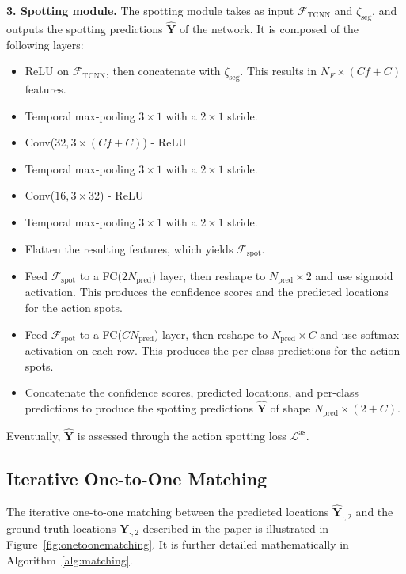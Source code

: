 \documentclass[10pt,twocolumn,letterpaper]{article}
\begin{document}
\textbf{\color{Green}3. Spotting module.} The spotting module takes as input $\mathcal{F}_\text{TCNN}$ and $\zeta_\text{seg}$, and outputs the spotting predictions $\hat{\textbf{Y}}$ of the network. It is composed of the following layers:
\begin{itemize}
    \item ReLU on $\mathcal{F}_\text{TCNN}$, then concatenate with $\zeta_\text{seg}$. This results in $N_F\times (Cf+C)$ features.
    \item Temporal max-pooling $3\times 1$ with a $2\times 1$ stride.
    \item Conv($32, 3\times (Cf+C)$) - ReLU
    \item Temporal max-pooling $3\times 1$ with a $2\times 1$ stride.
    \item Conv($16, 3\times 32$) - ReLU
    \item Temporal max-pooling $3\times 1$ with a $2\times 1$ stride.
    \item Flatten the resulting features, which yields $\mathcal{F}_\text{spot}$.
    \item Feed $\mathcal{F}_\text{spot}$ to a FC($2N_\text{pred}$) layer, then reshape to $N_\text{pred}\times 2$ and use sigmoid activation. This produces the confidence scores and the predicted locations for the action spots.
    \item Feed $\mathcal{F}_\text{spot}$ to a FC($CN_\text{pred}$) layer, then reshape to $N_\text{pred}\times C$ and use softmax activation on each row. This produces the per-class predictions for the action spots.
    \item Concatenate the confidence scores, predicted locations, and per-class predictions to produce the spotting predictions $\hat{\textbf{Y}}$ of shape $N_\text{pred}\times (2+C)$.
\end{itemize}
Eventually, $\hat{\textbf{Y}}$ is assessed through the action spotting loss $\mathcal{L}^\text{as}$.





\subsection{Iterative One-to-One Matching}

The iterative one-to-one matching between the predicted locations $\hat{\textbf{Y}}_{\cdot,2}$ and the ground-truth locations $\textbf{Y}_{\cdot,2}$ described in the paper is illustrated in Figure~\ref{fig:onetoonematching}. It is further detailed mathematically in Algorithm~\ref{alg:matching}.
\end{document}
